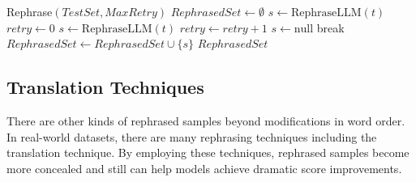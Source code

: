 \begin{algorithm}
\caption{The algorithm for rephrasing samples}
\label{algorithm:rephrase-algo}

\begin{algorithmic}[1]
\ENSURE Rephrase\((TestSet, MaxRetry)\) 
\STATE \( RephrasedSet \leftarrow \emptyset \)
    \STATE \(s \leftarrow \text{RephraseLLM}(t)\)
    \STATE \( retry \leftarrow  0\)
        \STATE \(s \leftarrow \text{RephraseLLM}(t)\)
        \STATE \( retry \leftarrow  retry + 1\)
            \STATE \(s \leftarrow \text{null}\)
            \STATE break
        \ENDIF
    \ENDWHILE
    \STATE \( RephrasedSet \leftarrow RephrasedSet\cup\{s\} \)
\ENDFOR
\RETURN \( RephrasedSet \)
\end{algorithmic}
\end{algorithm}
\belowcaptionskip=10pt



\subsection{Translation Techniques}



There are other kinds of rephrased samples beyond modifications in word order. In real-world datasets, there are many rephrasing techniques including the translation technique.
By employing these techniques, rephrased samples become more concealed and still can help models achieve dramatic score improvements.

